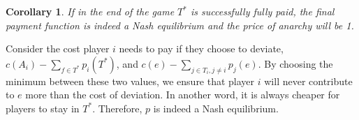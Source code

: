 \documentclass[11pt,psfig,times]{article}
\newtheorem{corollary}{Corollary}[section]
\begin{document}

	
\begin{corollary}
	If in the end of the game $T^*$ is successfully fully paid, the final payment function is indeed a Nash equilibrium and the price of anarchy will be 1.
\end{corollary}
Consider the cost player \(i\) needs to pay if they choose to deviate, \(c(A_i) - \sum_{f\in T^*}p_i(T^*)\), and \(c(e) - \sum_{j\in T_i,j\neq i}p_j(e)\). By choosing the minimum between these two values, we ensure that player \(i\) will never contribute to \(e\) more than the cost of deviation. In another word, it is always  cheaper for players to stay in \(T^*\). Therefore, \(p\) is indeed a Nash equilibrium. 
\end{document}
